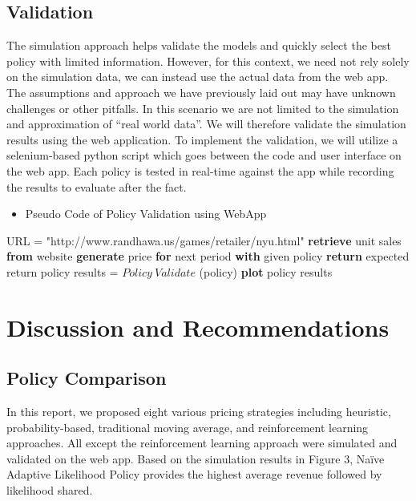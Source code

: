 \documentclass[11pt,a4paper]{article}
\begin{document}
\subsection{Validation}
The simulation approach helps validate the models and quickly select the best policy with limited information. 
However, for this context, we need not rely solely on the simulation data, we can instead use the actual data from the web app. 
The assumptions and approach we have previously laid out may have unknown challenges or other pitfalls. 
In this scenario we are not limited to the simulation and approximation of “real world data”. 
We will therefore validate the simulation results using the web application. 
To implement the validation, we will utilize a selenium-based python script which goes between the code and user interface on the web app. 
Each policy is tested in real-time against the app while recording the results to evaluate after the fact. \\

\begin{itemize}[leftmargin=*]
    \item Pseudo Code of Policy Validation using WebApp
\end{itemize}

\begin{algorithmic}[1]
    \State URL = "http://www.randhawa.us/games/retailer/nyu.html"
        \State \textbf{retrieve} unit sales \textbf{from} website
        \State \textbf{generate} price \textbf{for} next period \textbf{with} given policy
    \EndFor
    \State \textbf{return} expected return
    \EndProcedure
    \State
            \State policy results = $Policy\ Validate$ (policy) 
        \EndFor
    \EndFor
    \State \textbf{plot} policy results
\end{algorithmic}

\section{Discussion and Recommendations}

\subsection{Policy Comparison}
In this report, we proposed eight various pricing strategies including heuristic, probability-based, traditional moving average, and reinforcement learning approaches. 
All except the reinforcement learning approach were simulated and validated on the web app. 
Based on the simulation results in Figure 3, Naïve Adaptive Likelihood Policy provides the highest average revenue followed by likelihood shared.
\end{document}
